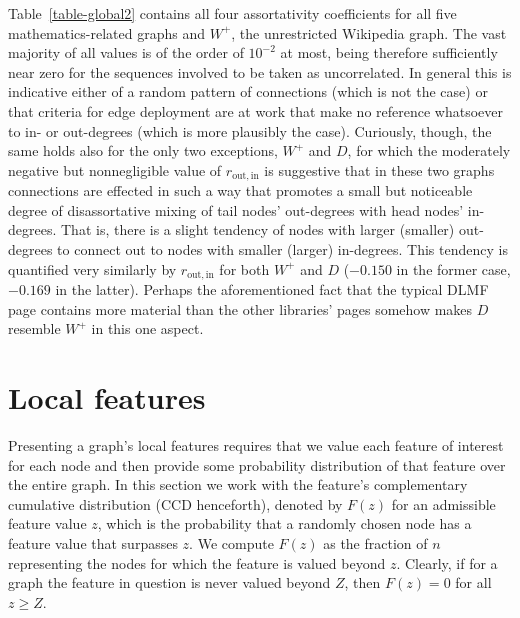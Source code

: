 \documentclass{article}
\begin{document}
Table~\ref{table-global2} contains all four assortativity coefficients for all
five mathematics-related graphs and $W^+$, the unrestricted Wikipedia graph. The
vast majority of all values is of the order of $10^{-2}$ at most, being
therefore sufficiently near zero for the sequences involved to be taken as
uncorrelated. In general this is indicative either of a random pattern of
connections (which is not the case) or that criteria for edge deployment are at
work that make no reference whatsoever to in- or out-degrees (which is more
plausibly the case). Curiously, though, the same holds also for the only two
exceptions, $W^+$ and $D$, for which the moderately negative but nonnegligible
value of $r_\mathrm{out,in}$ is suggestive that in these two graphs connections
are effected in such a way that promotes a small but noticeable degree of
disassortative mixing of tail nodes' out-degrees with head nodes' in-degrees.
That is, there is a slight tendency of nodes with larger (smaller) out-degrees
to connect out to nodes with smaller (larger) in-degrees. This tendency is
quantified very similarly by $r_\mathrm{out,in}$ for both $W^+$ and $D$
($-0.150$ in the former case, $-0.169$ in the latter). Perhaps the
aforementioned fact that the typical DLMF page contains more material than the
other libraries' pages somehow makes $D$ resemble $W^+$ in this one aspect.

\section{Local features}\label{local}

Presenting a graph's local features requires that we value each feature of
interest for each node and then provide some probability distribution of that
feature over the entire graph. In this section we work with the feature's
complementary cumulative distribution (CCD henceforth), denoted by $F(z)$ for
an admissible feature value $z$, which is the probability that a randomly chosen
node has a feature value that surpasses $z$. We compute $F(z)$ as the fraction
of $n$ representing the nodes for which the feature is valued beyond $z$.
Clearly, if for a graph the feature in question is never valued beyond $Z$, then
$F(z)=0$ for all $z\ge Z$.
\end{document}
